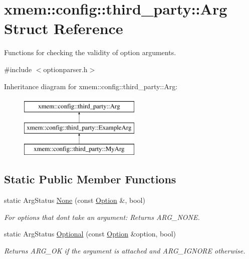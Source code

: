 \hypertarget{structxmem_1_1config_1_1third__party_1_1_arg}{}\section{xmem\+:\+:config\+:\+:third\+\_\+party\+:\+:Arg Struct Reference}
\label{structxmem_1_1config_1_1third__party_1_1_arg}


Functions for checking the validity of option arguments.  




{\ttfamily \#include $<$optionparser.\+h$>$}

Inheritance diagram for xmem\+:\+:config\+:\+:third\+\_\+party\+:\+:Arg\+:\begin{figure}[H]
\begin{center}
\leavevmode
\includegraphics[height=3.000000cm]{structxmem_1_1config_1_1third__party_1_1_arg}
\end{center}
\end{figure}
\subsection*{Static Public Member Functions}
\begin{DoxyCompactItemize}
\item 
\hypertarget{structxmem_1_1config_1_1third__party_1_1_arg_afdfd4a0adea72c759ec04bf5feaf3ec0}{}static Arg\+Status \hyperlink{structxmem_1_1config_1_1third__party_1_1_arg_afdfd4a0adea72c759ec04bf5feaf3ec0}{None} (const \hyperlink{classxmem_1_1config_1_1third__party_1_1_option}{Option} \&, bool)\label{structxmem_1_1config_1_1third__party_1_1_arg_afdfd4a0adea72c759ec04bf5feaf3ec0}

\begin{DoxyCompactList}\small\item\em For options that don\textquotesingle{}t take an argument\+: Returns A\+R\+G\+\_\+\+N\+O\+N\+E. \end{DoxyCompactList}\item 
\hypertarget{structxmem_1_1config_1_1third__party_1_1_arg_a842eb05bf9c4581b082613f044691d89}{}static Arg\+Status \hyperlink{structxmem_1_1config_1_1third__party_1_1_arg_a842eb05bf9c4581b082613f044691d89}{Optional} (const \hyperlink{classxmem_1_1config_1_1third__party_1_1_option}{Option} \&option, bool)\label{structxmem_1_1config_1_1third__party_1_1_arg_a842eb05bf9c4581b082613f044691d89}

\begin{DoxyCompactList}\small\item\em Returns A\+R\+G\+\_\+\+O\+K if the argument is attached and A\+R\+G\+\_\+\+I\+G\+N\+O\+R\+E otherwise. \end{DoxyCompactList}\end{DoxyCompactItemize}


